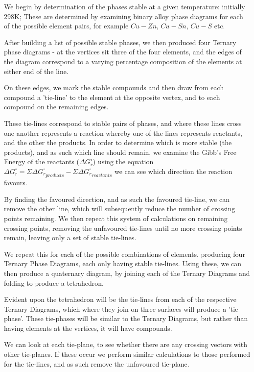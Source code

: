 We begin by determination of the phases stable at a given temperature: initially 298K; These are determined by examining binary alloy phase diagrams for each of the possible element pairs, for example $Cu-Zn$, $Cu-Sn$, $Cu-S$ etc. 

After building a list of possible stable phases, we then produced four Ternary phase diagrams - at the vertices sit three of the four elements, and the edges of the diagram correspond to a varying percentage composition of the elements at either end of the line. 

On these edges, we mark the stable compounds and then draw from each compound a 'tie-line' to the element at the opposite vertex, and to each compound on the remaining edges. 

These tie-lines correspond to stable pairs of phases, and where these lines cross one another represents a reaction whereby one of the lines represents reactants, and the other the products. In order to determine which is more stable (the products), and as such which line should remain, we examine the Gibb's Free Energy of the reactants ($\Delta G_{r}^{\circ}$) using the equation $\Delta G_{r}^{\circ} = \Sigma\Delta {G_{r}^{\circ}}_{products} - \Sigma\Delta {G_{r}^{\circ}}_{reactants}$ we can see which direction the reaction favours.

By finding the favoured direction, and as such the favoured tie-line, we can remove the other line, which will subsequently reduce the number of crossing points remaining. We then repeat this system of calculations on remaining crossing points, removing the unfavoured tie-lines until no more crossing points remain, leaving only a set of stable tie-lines.

We repeat this for each of the possible combinations of elements, producing four Ternary Phase Diagrams, each only having stable tie-lines. Using these, we can then produce a quaternary diagram, by joining each of the Ternary Diagrams and folding to produce a tetrahedron. 

Evident upon the tetrahedron will be the tie-lines from each of the respective Ternary Diagrams, which where they join on three surfaces will produce a 'tie-phase'. These tie-phases will be similar to the Ternary Diagrams, but rather than having elements at the vertices, it will have compounds.

We can look at each tie-plane, to see whether there are any crossing vectors with other tie-planes. If these occur we perform similar calculations to those performed for the tie-lines, and as such remove the unfavoured tie-plane.

